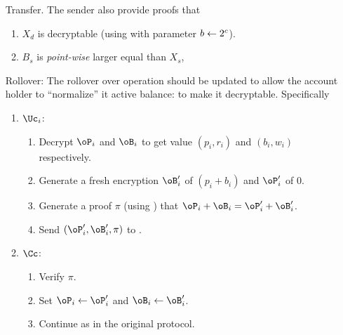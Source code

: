 \begin{enumerate}
	\item[Transfer.]  The sender also provide proofs that
	
	\begin{enumerate}
		\item $X_d$ is decryptable (\ie using \pZK{\rDec} with parameter $b\leftarrow 2^c$).
		
		\item $B_s$ is \emph{point-wise} larger  equal than $X_s$, 
	\end{enumerate} 
	
	\item[Rollover:] The rollover over operation should be updated to allow the account holder to ``normalize''  it active balance: to make it decryptable. Specifically
	
	\begin{enumerate}
		\item $\Uc_i$:
		
		\begin{enumerate}
			\item Decrypt $\oP_i$ and $\oB_i$ to get value $(p_i,r_i)$ and $(b_i,w_i)$ respectively.
			
			
			\item Generate a fresh  encryption $\oB_i'$ of $(p_i +b_i )$ and $\oP_i'$ of $0$.
			
			\item Generate a proof $\pi$ (\ie using \pZK{\rEq})   that $\oP_i+\oB_i = \oP_i'+ \oB_i'$.
			
			\item Send $(\oP_i',\oB_i',\pi)$ to \Cc.
		
		\end{enumerate}
		
		\item $\Cc$:
			\begin{enumerate}
				\item Verify $\pi$.
				
				\item Set $\oP_i  \asn \oP_i'$  and $\oB_i  \asn \oB_i'$.
				
				\item Continue as in the original protocol.
			\end{enumerate}
		
	\end{enumerate}
\end{enumerate}